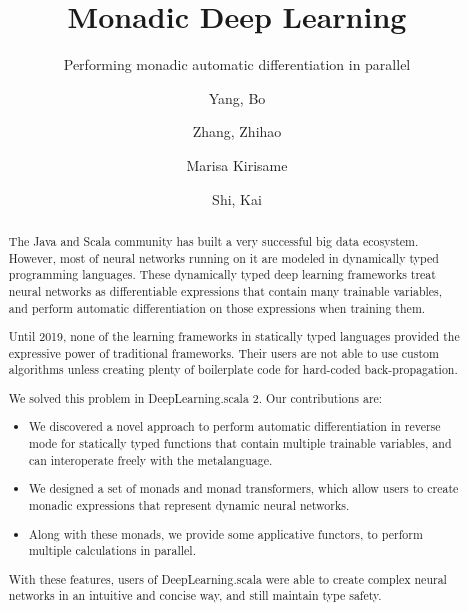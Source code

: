 \documentclass[acmsmall,10pt,screen]{acmart}
\begin{document}
\title{Monadic Deep Learning}
\subtitle{Performing monadic automatic differentiation in parallel}

\author{Yang, Bo}
\author{Zhang, Zhihao}
\author{Marisa Kirisame} 
\author{Shi, Kai} 

\begin{abstract}
The Java and Scala community has built a very successful big data ecosystem.
However, most of neural networks running on it are modeled in dynamically typed programming languages.
These dynamically typed deep learning frameworks treat neural networks as differentiable expressions that contain many \glspl{trainable variable},
and perform automatic differentiation on those expressions when training them.

Until 2019, none of the learning frameworks in statically typed languages provided the expressive power of traditional frameworks.
Their users are not able to use custom algorithms unless creating plenty of boilerplate code for hard-coded back-propagation.

We solved this problem in DeepLearning.scala 2. Our contributions are:

\begin{itemize}
  \item We discovered a novel approach to perform automatic differentiation in reverse mode for statically typed functions that contain multiple \glspl{trainable variable}, and can interoperate freely with the metalanguage.
  \item We designed a set of monads and monad transformers, which allow users to create monadic expressions that represent dynamic neural networks.
  \item Along with these monads, we provide some applicative functors, to perform multiple calculations in parallel.
\end{itemize}

With these features, users of DeepLearning.scala were able to create complex neural networks in an intuitive and concise way, and still maintain type safety.
\end{abstract}
\end{document}
